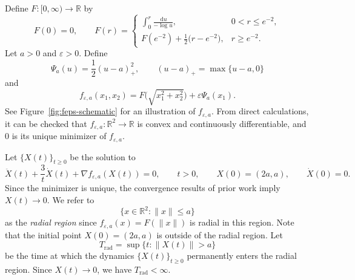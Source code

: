 \documentclass{article}
\newtheorem{lemma}[theorem]{Lemma}
\theoremstyle{remark}
\newcommand{\R}{\mathbb{R}}
\newcommand{\dd}{\,\mathrm{d}}
\begin{document}
Define $F\colon[0,\infty)\to\R$ by
\[
  F(0)=0,
  \qquad
  F(r)=
  \begin{cases}
    \displaystyle \int_0^r \frac{\dd u}{-\log u}, & 0<r\le e^{-2},\\[6pt]
    F(e^{-2})+\tfrac12\bigl(r-e^{-2}\bigr), & r\ge e^{-2}.
  \end{cases}
\]
Let $a>0$ and $\varepsilon>0$. Define
\[
  \Psi_a(u)=\frac12 (u-a)^2_+,
  \qquad
  (u-a)_+=\max\{u-a,0\}
  \]
and
\[
   f_{\varepsilon,a}(x_1,x_2)
  =
  F\Big(\sqrt{x_1^2+x_2^2}\Big)+\varepsilon \Psi_a(x_1).
\]
See Figure~\ref{fig:feps-schematic} for an illustration of $f_{\varepsilon,a}$.
From direct calculations, it can be checked that $f_{\varepsilon,a}\colon\mathbb{R}^2\rightarrow\mathbb{R}$ is convex and continuously differentiable, and $0$ is its unique minimizer of $f_{\varepsilon,a}$.

Let $\{X(t)\}_{t\ge 0}$ be the solution to
\[
   \ddot X(t)+\frac{3}{t}\dot X(t)+\nabla f_{\varepsilon,a}(X(t))=0,
  \qquad t>0,
  \qquad X(0)=(2a,a),
  \qquad \dot X(0)=0.
\]
Since the minimizer is unique, the convergence results of prior work imply $X(t)\rightarrow 0$. 
We refer to 
\[
\{x\in \mathbb{R}^2:\|x\|\le a\}
\]
as the \emph{radial region} since $f_{\varepsilon,a}(x)=F(\|x\|)$ is radial in this region. 
Note that the initial point $X(0)=(2a,a)$ is outside of the radial region.
Let
\begin{equation*}
T_\mathrm{rad}=\sup\{t: \|X(t)\|> a\}
\end{equation*}
be the time at which the dynamics $\{X(t)\}_{t\ge 0}$ permanently enters the radial region. Since $X(t)\rightarrow 0$, we have $T_\mathrm{rad}<\infty$.






\end{document}
